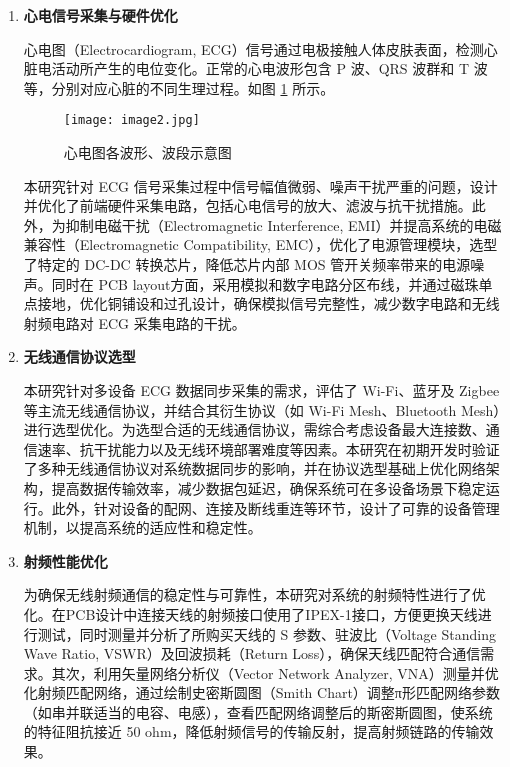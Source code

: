 \begin{enumerate}
    \item \textbf{心电信号采集与硬件优化}
    
    心电图（Electrocardiogram, ECG）信号通过电极接触人体皮肤表面，检测心脏电活动所产生的电位变化。正常的心电波形包含 P 波、QRS 波群和 T 波等，分别对应心脏的不同生理过程。如图 \ref{F.ECG_image2} 所示。

    \begin{figure}[hbt]
        \centering
        \texttt{[image: image2.jpg]}
        \caption{心电图各波形、波段示意图}
        \label{F.ECG_image2}
    \end{figure}
    
    本研究针对 ECG 信号采集过程中信号幅值微弱、噪声干扰严重的问题，设计并优化了前端硬件采集电路，包括心电信号的放大、滤波与抗干扰措施。此外，为抑制电磁干扰（Electromagnetic Interference, EMI）并提高系统的电磁兼容性（Electromagnetic Compatibility, EMC），优化了电源管理模块，选型了特定的 DC-DC 转换芯片，降低芯片内部 MOS 管开关频率带来的电源噪声。同时在 PCB layout方面，采用模拟和数字电路分区布线，并通过磁珠单点接地，优化铜铺设和过孔设计，确保模拟信号完整性，减少数字电路和无线射频电路对 ECG 采集电路的干扰。

    \item \textbf{无线通信协议选型}
    
    本研究针对多设备 ECG 数据同步采集的需求，评估了 Wi-Fi、蓝牙及 Zigbee 等主流无线通信协议，并结合其衍生协议（如 Wi-Fi Mesh、Bluetooth Mesh）进行选型优化。为选型合适的无线通信协议，需综合考虑设备最大连接数、通信速率、抗干扰能力以及无线环境部署难度等因素。本研究在初期开发时验证了多种无线通信协议对系统数据同步的影响，并在协议选型基础上优化网络架构，提高数据传输效率，减少数据包延迟，确保系统可在多设备场景下稳定运行。此外，针对设备的配网、连接及断线重连等环节，设计了可靠的设备管理机制，以提高系统的适应性和稳定性。

    \item \textbf{射频性能优化}  
    
    为确保无线射频通信的稳定性与可靠性，本研究对系统的射频特性进行了优化。在PCB设计中连接天线的射频接口使用了IPEX-1接口，方便更换天线进行测试，同时测量并分析了所购买天线的 S 参数、驻波比（Voltage Standing Wave Ratio, VSWR）及回波损耗（Return Loss），确保天线匹配符合通信需求。其次，利用矢量网络分析仪（Vector Network Analyzer, VNA）测量并优化射频匹配网络，通过绘制史密斯圆图（Smith Chart）调整π形匹配网络参数（如串并联适当的电容、电感），查看匹配网络调整后的斯密斯圆图，使系统的特征阻抗接近 50 ohm，降低射频信号的传输反射，提高射频链路的传输效果。


\end{enumerate}
